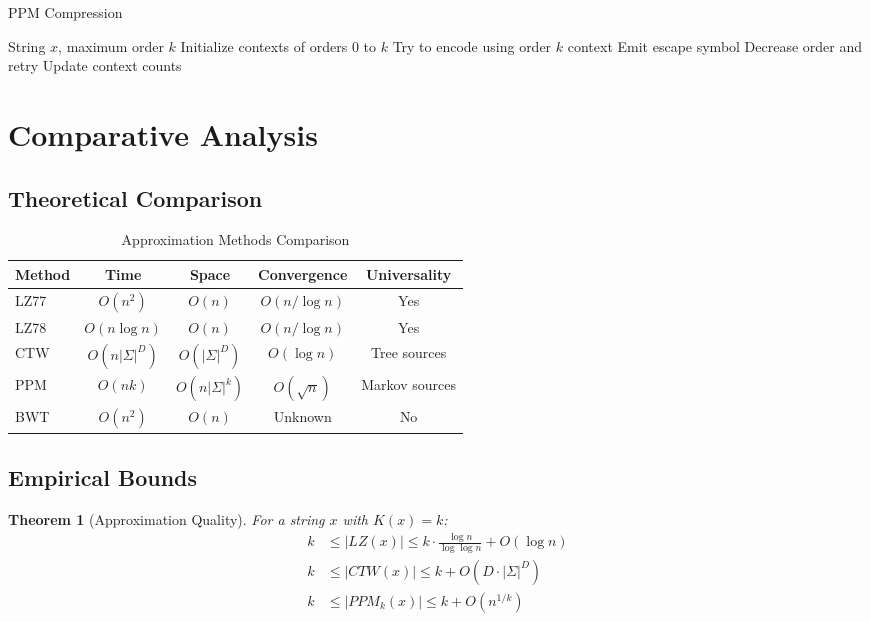 \documentclass[12pt,a4paper]{report}
\newtheorem{theorem}{Theorem}[chapter]
\begin{document}
\begin{algorithm}
\caption{PPM Compression}
\begin{algorithmic}[1]
\REQUIRE String $x$, maximum order $k$
\STATE Initialize contexts of orders $0$ to $k$
    \STATE Try to encode using order $k$ context
        \STATE Emit escape symbol
        \STATE Decrease order and retry
    \ENDIF
    \STATE Update context counts
\ENDFOR
\end{algorithmic}
\end{algorithm}

\section{Comparative Analysis}

\subsection{Theoretical Comparison}

\begin{table}[h]
\centering
\caption{Approximation Methods Comparison}
\begin{tabular}{lcccc}
\toprule
\textbf{Method} & \textbf{Time} & \textbf{Space} & \textbf{Convergence} & \textbf{Universality} \\
\midrule
LZ77 & $O(n^2)$ & $O(n)$ & $O(n/\log n)$ & Yes \\
LZ78 & $O(n\log n)$ & $O(n)$ & $O(n/\log n)$ & Yes \\
CTW & $O(n|\Sigma|^D)$ & $O(|\Sigma|^D)$ & $O(\log n)$ & Tree sources \\
PPM & $O(nk)$ & $O(n|\Sigma|^k)$ & $O(\sqrt{n})$ & Markov sources \\
BWT & $O(n^2)$ & $O(n)$ & Unknown & No \\
\bottomrule
\end{tabular}
\end{table}

\subsection{Empirical Bounds}

\begin{theorem}[Approximation Quality]
For a string $x$ with $K(x) = k$:
\begin{align}
k &\leq |LZ(x)| \leq k \cdot \frac{\log n}{\log\log n} + O(\log n) \\
k &\leq |CTW(x)| \leq k + O(D \cdot |\Sigma|^D) \\
k &\leq |PPM_k(x)| \leq k + O(n^{1/k})
\end{align}
\end{theorem}
\end{document}
